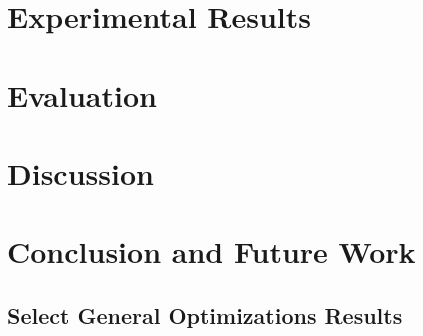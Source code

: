 \documentclass[10pt]{article}
\begin{document}
\section{Experimental Results}


\section{Evaluation}


\section{Discussion}


\section{Conclusion and Future Work}


\pagebreak




\pagebreak
\begin{appendices}

\section{Select General Optimizations Results}
\label{appendix:general-optimizations-results}
%

\end{appendices}
\end{document}
